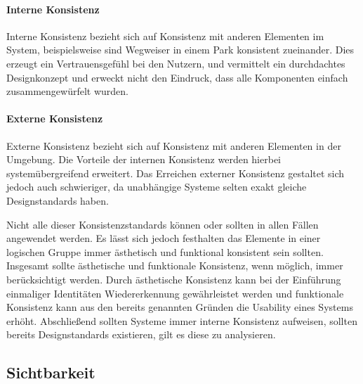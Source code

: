 \paragraph{Interne Konsistenz}
Interne Konsistenz bezieht sich auf Konsistenz mit anderen Elementen im System, beispielsweise sind Wegweiser in einem Park konsistent zueinander.
Dies erzeugt ein Vertrauensgefühl bei den Nutzern, und vermittelt ein durchdachtes Designkonzept und erweckt nicht den Eindruck, dass alle Komponenten einfach zusammengewürfelt wurden.

\paragraph{Externe Konsistenz}
Externe Konsistenz bezieht sich auf Konsistenz mit anderen Elementen in der Umgebung. Die Vorteile der internen Konsistenz werden hierbei systemübergreifend erweitert. Das Erreichen externer Konsistenz gestaltet sich jedoch auch schwieriger, da unabhängige Systeme selten exakt gleiche Designstandards haben.

Nicht alle dieser Konsistenzstandards können oder sollten in allen Fällen angewendet werden. 
Es lässt sich jedoch festhalten das Elemente in einer logischen Gruppe immer ästhetisch und funktional konsistent sein sollten.
Insgesamt sollte ästhetische und funktionale Konsistenz, wenn möglich, immer berücksichtigt werden.
Durch ästhetische Konsistenz kann bei der Einführung einmaliger Identitäten Wiedererkennung gewährleistet werden und funktionale Konsistenz kann aus den bereits genannten Gründen die Usability eines Systems erhöht.
Abschließend sollten Systeme immer interne Konsistenz aufweisen, sollten bereits Designstandards existieren, gilt es diese zu analysieren.\cite{Lidwell.2010}

\subsection*{Sichtbarkeit}

